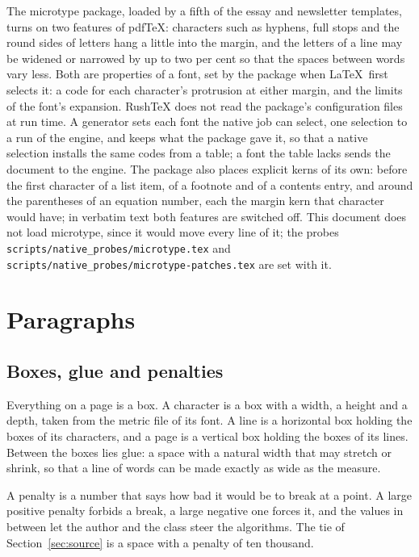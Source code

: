 \documentclass{article}
\numberwithin{equation}{section}
\theoremstyle{definition}
\theoremstyle{remark}
\begin{document}
The microtype package, loaded by a fifth of the essay and newsletter templates, turns on
two features of pdf\TeX: characters such as hyphens, full stops and the round sides of
letters hang a little into the margin, and the letters of a line may be widened or
narrowed by up to two per cent so that the spaces between words vary less. Both are
properties of a font, set by the package when \LaTeX\ first selects it: a code for each
character's protrusion at either margin, and the limits of the font's expansion.
RushTeX does not read the package's configuration files at run time. A generator sets
each font the native job can select, one selection to a run of the engine, and keeps
what the package gave it, so that a native selection installs the same codes from a
table; a font the table lacks sends the document to the engine. The package also places
explicit kerns of its own: before the first character of a list item, of a footnote and
of a contents entry, and around the parentheses of an equation number, each the margin
kern that character would have; in verbatim text both features are switched off. This
document does not load microtype, since it would move every line of it; the probes
\texttt{scripts/native\_probes/microtype.tex} and
\texttt{scripts/native\_probes/microtype-patches.tex} are set with it.

\section{Paragraphs}\label{sec:paragraphs}

\subsection{Boxes, glue and penalties}

Everything on a page is a box. A character is a box with a width, a height and a
depth, taken from the metric file of its font. A line is a horizontal box holding the
boxes of its characters, and a page is a vertical box holding the boxes of its lines.
Between the boxes lies glue: a space with a natural width that may stretch or shrink,
so that a line of words can be made exactly as wide as the measure.

A penalty is a number that says how bad it would be to break at a point. A large
positive penalty forbids a break, a large negative one forces it, and the values in
between let the author and the class steer the algorithms. The tie of
Section~\ref{sec:source} is a space with a penalty of ten thousand.
\end{document}
